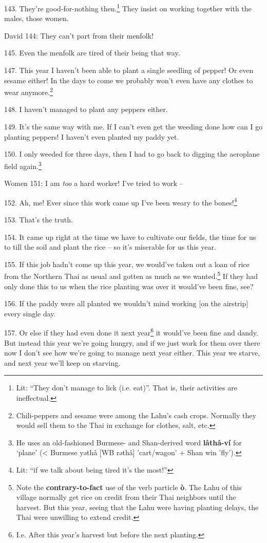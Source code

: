 143. They're good-for-nothing then.\footnote{Lit: ``They don't manage to lick (i.e. eat)''. That is, their activities are ineffectual.} They insist on working together with the
males, those women.

David 144: They can't part from their menfolk!

145. Even the menfolk are tired of their being that way.

147. This year I haven't been able to plant a single seedling of pepper! Or even
sesame either! In the days to come we probably won't even have any clothes to wear
anymore.\footnote{Chili-peppers and sesame were among the Lahu's cash crops. Normally they would sell them to the Thai in exchange for clothes, salt, etc.}

148. I haven't managed to plant any peppers either.

149. It's the same way with me. If I can't even get the weeding done how can I
go planting peppers! I haven't even planted my paddy yet.

150. I only weeded for three days, then I had to go back to digging the aeroplane
field again.\footnote{He uses an old-fashioned Burmese- and Shan-derived word \textbf{lâthâ-ví} for `plane' (< Burmese yəthâ [WB rəthâ] 'cart/wagon' + Shan win 'fly').}

Women 151: I am \textit{too} a hard worker! I've tried to work --

152. Ah, me! Ever since this work came up I've been weary to the bones!\footnote{Lit: ``if we talk about being tired it's the most!''}

153. That's the truth.

154. It came up right at the time we have to cultivate our fields, the time for
us to till the soil and plant the rice -- so it's miserable for us this year.

155. If this job hadn't come up this year, we would've taken out a loan of rice
from the Northern Thai as usual and gotten as much as we wanted.\footnote{Note the \textbf{contrary-to-fact} use of the verb particle \textbf{ò}. The Lahu of this village normally get rice on credit from their Thai neighbors until the harvest. But this year, seeing that the Lahu were having planting delays, the Thai were unwilling to extend credit.} If they had
only done this to us when the rice planting was over it would've been fine, see?

156. If the paddy were all planted we wouldn't mind working [on the airstrip] every
single day.

157. Or else if they had even done it next year\footnote{I.e. After this year's harvest but before the next planting.} it would've been fine and dandy.
But instead this year we're going hungry, and if we just work for them over there
now I don't see how we're going to manage next year either. This year we starve,
and next year we'll keep on starving.

